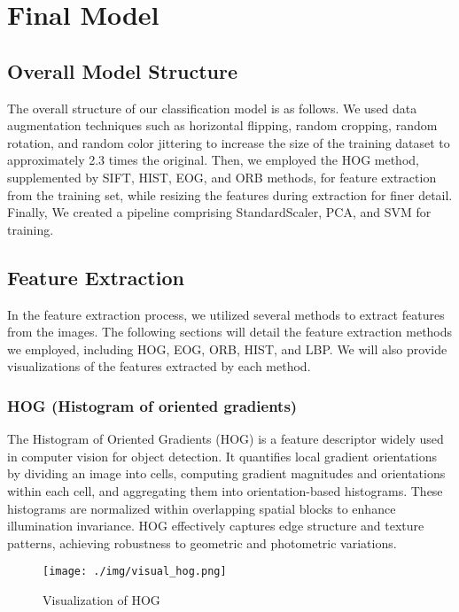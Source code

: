 \documentclass[a4paper,11pt]{article}
\begin{document}
\section{Final Model}

\subsection{Overall Model Structure}
The overall structure of our classification model is as follows. We used data augmentation techniques such as horizontal flipping, random cropping, random rotation, and random color jittering to increase the size of the training dataset to approximately 2.3 times the original. Then, we employed the HOG method, supplemented by SIFT, HIST, EOG, and ORB methods, for feature extraction from the training set, while resizing the features during extraction for finer detail. Finally, We created a pipeline comprising StandardScaler, PCA, and SVM for training.

\subsection{Feature Extraction}

In the feature extraction process, we utilized several methods to extract features from the images. The following sections will detail the feature extraction methods we employed, including HOG, EOG, ORB, HIST, and LBP. We will also provide visualizations of the features extracted by each method.

\subsubsection{HOG (Histogram of oriented gradients)}

The Histogram of Oriented Gradients (HOG) is a feature descriptor widely used in computer vision for object detection. It quantifies local gradient orientations by dividing an image into cells, computing gradient magnitudes and orientations within each cell, and aggregating them into orientation-based histograms. These histograms are normalized within overlapping spatial blocks to enhance illumination invariance. HOG effectively captures edge structure and texture patterns, achieving robustness to geometric and photometric variations.

\begin{figure}[H]
    \centering
    \texttt{[image: ./img/visual\_hog.png]}
    \caption[visual_hog] {Visualization of HOG}
\end{figure}
\end{document}
